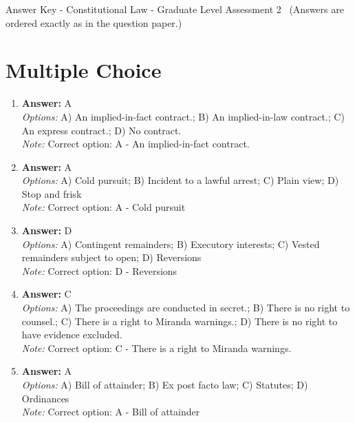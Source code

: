\documentclass[12pt]{article}
\begin{document}
\begin{center}
Answer Key - Constitutional Law - Graduate Level Assessment 2 \
\small (Answers are ordered exactly as in the question paper.)
\end{center}

\section*{Multiple Choice}
\begin{enumerate}[label=\arabic*.]
\item \textbf{Answer:} A
\\ \textit{Options:} A) An implied-in-fact contract.; B) An implied-in-law contract.; C) An express contract.; D) No contract.
\\ \textit{Note:} Correct option: A - An implied-in-fact contract.
\item \textbf{Answer:} A
\\ \textit{Options:} A) Cold pursuit; B) Incident to a lawful arrest; C) Plain view; D) Stop and frisk
\\ \textit{Note:} Correct option: A - Cold pursuit
\item \textbf{Answer:} D
\\ \textit{Options:} A) Contingent remainders; B) Executory interests; C) Vested remainders subject to open; D) Reversions
\\ \textit{Note:} Correct option: D - Reversions
\item \textbf{Answer:} C
\\ \textit{Options:} A) The proceedings are conducted in secret.; B) There is no right to counsel.; C) There is a right to Miranda warnings.; D) There is no right to have evidence excluded.
\\ \textit{Note:} Correct option: C - There is a right to Miranda warnings.
\item \textbf{Answer:} A
\\ \textit{Options:} A) Bill of attainder; B) Ex post facto law; C) Statutes; D) Ordinances
\\ \textit{Note:} Correct option: A - Bill of attainder
\end{enumerate}
\end{document}
